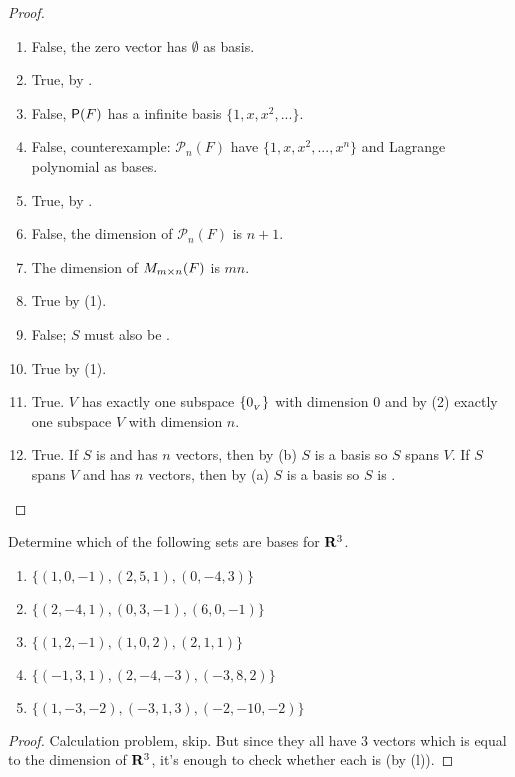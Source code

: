 \begin{proof}\ 
\begin{enumerate}
\item False, the zero vector has \(\emptyset\) as basis.
\item True, by .
\item False, \(\textsf{P}(F)\) has a infinite basis \(\{ 1, x, x^2, ... \}\).
\item False, counterexample: \(\mathcal{P}_n(F)\) have \(\{ 1, x, x^2, ..., x^n \}\) and Lagrange polynomial as bases.
\item True, by \CORO{1.10.1}.
\item False, the dimension of \(\mathcal{P}_n(F)\) is \(n + 1\).
\item The dimension of \(M_{m \times n}(F)\) is \(mn\).
\item True by (1).
\item False; \(S\) must also be \LID{}.
\item True by (1).
\item True. \(V\) has exactly one subspace \(\{ 0_{_V} \}\) with dimension \(0\) and by (2) exactly one subspace \(V\) with dimension \(n\).
\item True.
    If \(S\) is \LID{} and has \(n\) vectors, then by (b) \(S\) is a basis so \(S\) spans \(V\).
    If \(S\) spans \(V\) and has \(n\) vectors, then by \CORO{1.10.3}(a) \(S\) is a basis so \(S\) is \LID{}. 
\end{enumerate}
\end{proof}

\begin{exercise} \label{exercise 1.6.2}
Determine which of the following sets are bases for \(\mathbf{R}^3\).
\begin{enumerate}
\item \(\{ (1 , 0, -1), (2, 5, 1), (0, -4, 3) \}\)
\item \(\{ (2, -4, 1), (0, 3, -1), (6, 0, -1) \}\)
\item \(\{ (1, 2, -1), (1, 0, 2), (2, 1, 1) \}\)
\item \(\{ (-1, 3, 1),(2, -4, -3),(-3, 8 ,2) \}\)
\item \(\{ (1, -3, -2), (-3, 1, 3), (-2, -10, -2) \}\)
\end{enumerate}
\end{exercise}

\begin{proof}
Calculation problem, skip.
But since they all have \(3\) vectors which is equal to the dimension of \(\mathbf{R}^3\), it's enough to check whether each is \LID{} (by (l)).
\end{proof}

